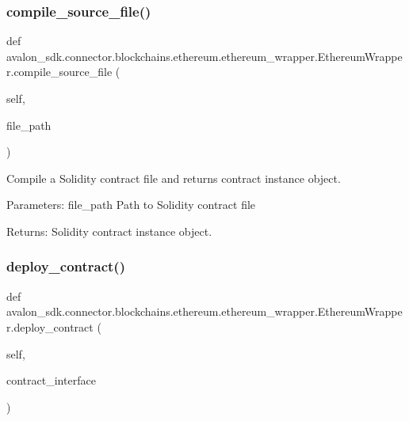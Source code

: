 \subsubsection{\texorpdfstring{compile\+\_\+source\+\_\+file()}{compile\_source\_file()}}
{\footnotesize\ttfamily def avalon\+\_\+sdk.\+connector.\+blockchains.\+ethereum.\+ethereum\+\_\+wrapper.\+Ethereum\+Wrapper.\+compile\+\_\+source\+\_\+file (\begin{DoxyParamCaption}\item[{}]{self,  }\item[{}]{file\+\_\+path }\end{DoxyParamCaption})}

\begin{DoxyVerb}Compile a Solidity contract file and returns contract instance object.

Parameters:
file_path    Path to Solidity contract file

Returns:
Solidity contract instance object.
\end{DoxyVerb}
 \mbox{\label{classavalon__sdk_1_1connector_1_1blockchains_1_1ethereum_1_1ethereum__wrapper_1_1EthereumWrapper_a64441d8c0b35cb902330729b57264657}} 
\subsubsection{\texorpdfstring{deploy\+\_\+contract()}{deploy\_contract()}}
{\footnotesize\ttfamily def avalon\+\_\+sdk.\+connector.\+blockchains.\+ethereum.\+ethereum\+\_\+wrapper.\+Ethereum\+Wrapper.\+deploy\+\_\+contract (\begin{DoxyParamCaption}\item[{}]{self,  }\item[{}]{contract\+\_\+interface }\end{DoxyParamCaption})}

